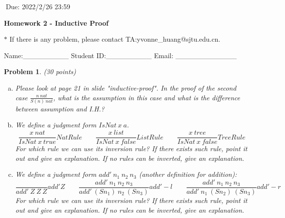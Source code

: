 \documentclass[12pt]{article}
\newtheorem{hw}{Problem}
\newenvironment{sol}
  {\par\vspace{3mm}\noindent{\it Solution}.}
  {\qed}
\begin{document}
$\;$\hfill Due: 2022/2/26 23:59

\begin{center}
{\LARGE\bf Homework 2 - Inductive Proof}
\end{center}

\begin{center}
	\footnotesize{\color{red}$*$ If there is any problem, please contact TA:yvonne\_huang@sjtu.edu.cn.}
	
	\footnotesize{\color{blue} \quad Name:\_\_\_\_\_\_\_\_\_  \quad Student ID:\_\_\_\_\_\_\_\_\_ \quad Email: \_\_\_\_\_\_\_\_\_\_\_\_}
\end{center}


\begin{hw}\rm {(30 points)}
\begin{enumerate}[(a)]
	\item Please look at page 21 in slide "inductive-proof". In the proof of the second case $\frac{n\ nat}{S(n)\ nat}$, what is the assumption in this case and what is the difference between assumption and I.H.?
	
	\item We define a judgment form $IsNat\ x\ a$.
	\[
	\frac{x\ nat}{IsNat\ x\ true}NatRule
	\qquad
	\frac{x\ list}{IsNat\ x\ false}ListRule
	\qquad
	\frac{x\ tree}{IsNat\ x\ false}TreeRule
	\]
	For which rule we can use its inversion rule? If there exists such rule, point it out and give an explanation. If no rules can be inverted, give an explanation.
	
	\item We define a judgment form $add'\ n_{1}\ n_{2}\ n_{3}$ (another definition for addition):
	\[
	\frac{}{add'\ Z\ Z\ Z}add'Z
	\qquad
	\frac{add'\ n_{1}\ n_{2}\ n_{3}}{add'\ (S n_{1})\ n_{2}\ (S n_{3})}add'-l
	\qquad
	\frac{add'\ n_{1}\ n_{2}\ n_{3}}{add'\ n_{1}\ (S n_{2})\ (S n_{3})}add'-r
	\]
	For which rule we can use its inversion rule? If there exists such rule, point it out and give an explanation. If no rules can be inverted, give an explanation. 
	
\end{enumerate}
\end{hw}

%		
%		
\end{document}
